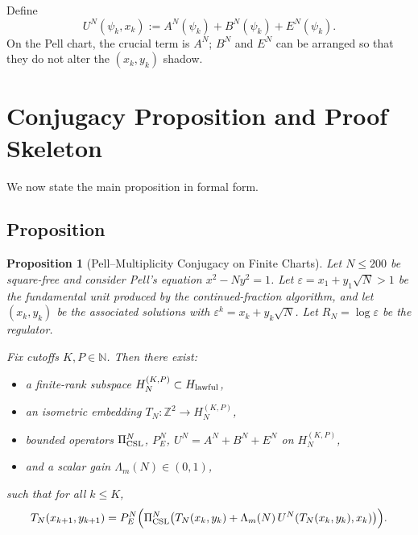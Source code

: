 \documentclass[11pt]{article}
\begin{document}
Define
\[
U^N(\psi_k, x_k) := A^N(\psi_k) + B^N(\psi_k) + E^N(\psi_k).
\]
On the Pell chart, the crucial term is \(A^N\); \(B^N\) and \(E^N\) can
be arranged so that they do not alter the \((x_k,y_k)\) shadow.

\section{Conjugacy Proposition and Proof Skeleton}

We now state the main proposition in formal form.

\subsection{Proposition}

\newtheorem{prop}{Proposition}
\begin{prop}[Pell--Multiplicity Conjugacy on Finite Charts]
Let \(N \le 200\) be square-free and consider Pell's equation
\(x^2 - N y^2 = 1\).
Let \(\varepsilon = x_1 + y_1 \sqrt{N} > 1\) be the fundamental unit
produced by the continued-fraction algorithm, and let \((x_k, y_k)\) be
the associated solutions with \(\varepsilon^k = x_k + y_k \sqrt{N}\).
Let \(R_N = \log \varepsilon\) be the regulator.

Fix cutoffs \(K, P \in \mathbb{N}\). Then there exist:
\begin{itemize}
  \item a finite-rank subspace \(H_N^{(K,P)} \subset H_{\rm lawful}\),
  \item an isometric embedding \(T_N : \mathbb{Z}^2 \to H_N^{(K,P)}\),
  \item bounded operators \(\Pi_{\rm CSL}^N\), \(P_E^N\),
        \(U^N = A^N + B^N + E^N\) on \(H_N^{(K,P)}\),
  \item and a scalar gain \(\Lambda_m(N) \in (0,1)\),
\end{itemize}
such that for all \(k \le K\),
\[
T_N(x_{k+1}, y_{k+1}) =
P_E^N\Bigl(\Pi_{\rm CSL}^N\bigl(T_N(x_k, y_k) + \Lambda_m(N)\,
U^N(T_N(x_k, y_k), x_k)\bigr)\Bigr).
\]


\end{prop}
\end{document}
